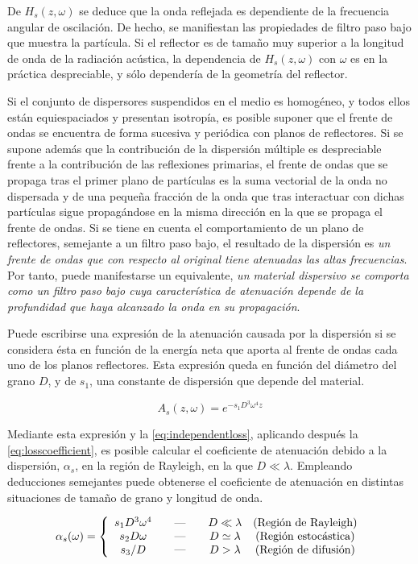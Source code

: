 De $H_s(z, \omega)$ se deduce que la onda reflejada es dependiente de la
frecuencia angular de oscilación. De hecho, se manifiestan las propiedades
de filtro paso bajo que muestra la partícula. Si el reflector es de tamaño
muy superior a la longitud de onda de la radiación acústica, la dependencia
de $H_s(z, \omega)$ con $\omega$ es en la práctica despreciable, y sólo
dependería de la geometría del reflector.

Si el conjunto de dispersores suspendidos en el medio es homogéneo, y todos
ellos están equiespaciados y presentan isotropía, es posible suponer que el
frente de ondas se encuentra de forma sucesiva y periódica con planos de
reflectores. Si se supone además que la contribución de la dispersión
múltiple es despreciable frente a la contribución de las reflexiones
primarias, el frente de ondas que se propaga tras el primer plano de
partículas es la suma vectorial de la onda no dispersada y de una pequeña
fracción de la onda que tras interactuar con dichas partículas sigue
propagándose en la misma dirección en la que se propaga el frente de ondas.
Si se tiene en cuenta el comportamiento de un plano de reflectores,
semejante a un filtro paso bajo, el resultado de la dispersión es \emph{un
frente de ondas que con respecto al original tiene atenuadas las altas
frecuencias}. Por tanto, puede manifestarse un equivalente, \emph{un
material dispersivo se comporta como un filtro paso bajo cuya
característica de atenuación depende de la profundidad que haya alcanzado
la onda en su propagación}.

Puede escribirse una expresión de la atenuación causada por la dispersión
si se considera ésta en función de la energía neta que aporta al frente de
ondas cada uno de los planos reflectores. Esta expresión queda en función
del diámetro del grano $D$, y de $s_1$, una constante de dispersión que
depende del material.

\begin{equation}
	A_s(z, \omega) = e^{-s_1D^3\omega^4z}
	\label{eq:dispersionloss}
\end{equation}

Mediante esta expresión y la \cref{eq:independentloss}, aplicando después
la \cref{eq:losscoefficient}, es posible calcular el coeficiente de
atenuación debido a la dispersión, $\alpha_s$, en la región de Rayleigh, en
la que $D\ll\lambda$. Empleando deducciones semejantes puede obtenerse el
coeficiente de atenuación en distintas situaciones de tamaño de grano y
longitud de onda.

{\setlength{\extrarowheight}{0.5ex}
\begin{equation}
	\alpha_s(\omega) = \left\{
	\begin{array}{c@{\qquad\text{---}\qquad}c@{\quad}c}
		s_1D^3\omega^4 & D\ll\lambda %
		& \text{(Región de Rayleigh)} \\
		s_2D\omega & D\simeq\lambda %
		& \text{(Región estocástica)} \\
		s_3/D & D>\lambda & \text{(Región de difusión)}
	\end{array}
	\right.
	\label{eq:dispersionlossreg}
\end{equation}}

